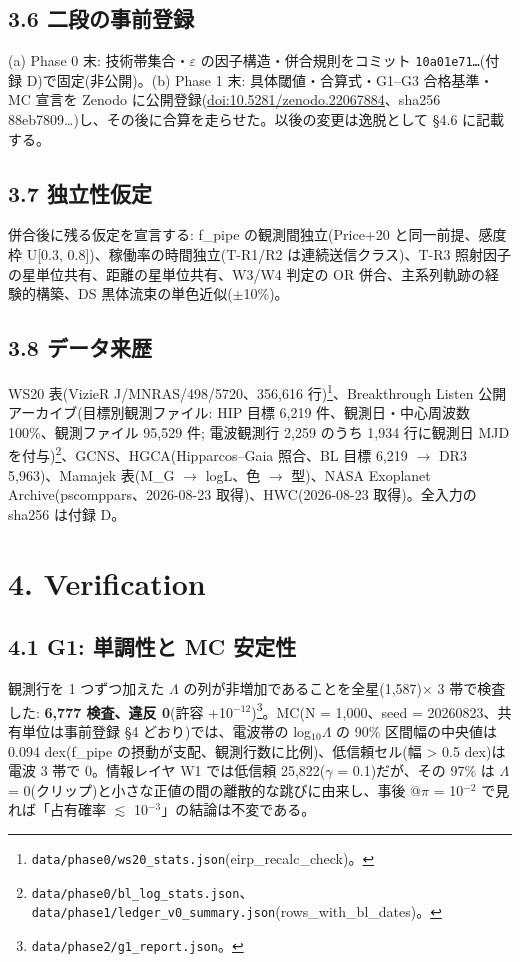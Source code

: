 \documentclass[11pt]{article}
\begin{document}
\subsection*{3.6 二段の事前登録}
\noindent (a) Phase 0 末: 技術帯集合・\(\varepsilon\) の因子構造・併合規則をコミット \texttt{10a01e71…}(付録 D)で固定(非公開)。(b) Phase 1 末: 具体閾値・合算式・G1–G3 合格基準・MC 宣言を Zenodo に公開登録(\url{doi:10.5281/zenodo.22067884}、sha256 88eb7809\ldots{})し、その後に合算を走らせた。以後の変更は逸脱として \S{}4.6 に記載する。\par\smallskip

\subsection*{3.7 独立性仮定}
\noindent 併合後に残る仮定を宣言する: f\_pipe の観測間独立(Price+20 と同一前提、感度枠 U[0.3, 0.8])、稼働率の時間独立(T-R1/R2 は連続送信クラス)、T-R3 照射因子の星単位共有、距離の星単位共有、W3/W4 判定の OR 併合、主系列軌跡の経験的構築、DS 黒体流束の単色近似(\(\pm\)10\%)。\par\smallskip

\subsection*{3.8 データ来歴}
\noindent WS20 表(VizieR J/MNRAS/498/5720、356,616 行)\footnote{\texttt{data/phase0/ws20\_stats.json}(eirp\_recalc\_check)。}、Breakthrough Listen 公開アーカイブ(目標別観測ファイル: HIP 目標 6,219 件、観測日・中心周波数 100\%、観測ファイル 95,529 件; 電波観測行 2,259 のうち 1,934 行に観測日 MJD を付与)\footnote{\texttt{data/phase0/bl\_log\_stats.json}、\texttt{data/phase1/ledger\_v0\_summary.json}(rows\_with\_bl\_dates)。}、GCNS、HGCA(Hipparcos–Gaia 照合、BL 目標 6,219 \(\rightarrow\) DR3 5,963)、Mamajek 表(M\_G \(\rightarrow\) logL、色 \(\rightarrow\) 型)、NASA Exoplanet Archive(pscomppars、2026-08-23 取得)、HWC(2026-08-23 取得)。全入力の sha256 は付録 D。\par\smallskip


\section*{4. Verification}

\subsection*{4.1 G1: 単調性と MC 安定性}
\noindent 観測行を 1 つずつ加えた \(\Lambda\) の列が非増加であることを全星(1,587)\(\times\) 3 帯で検査した: \textbf{6,777 検査、違反 0}(許容 +10\(^{-12}\))\footnote{\texttt{data/phase2/g1\_report.json}。}。MC(N = 1,000、seed = 20260823、共有単位は事前登録 \S{}4 どおり)では、電波帯の log\(_{10}\)\(\Lambda\) の 90\% 区間幅の中央値は 0.094 dex(f\_pipe の摂動が支配、観測行数に比例)、低信頼セル(幅 > 0.5 dex)は電波 3 帯で 0。情報レイヤ W1 では低信頼 25,822(\(\gamma\) = 0.1)だが、その 97\% は \(\Lambda\) = 0(クリップ)と小さな正値の間の離散的な跳びに由来し、事後 @\(\pi\) = 10\(^{-2}\) で見れば「占有確率 \(\lesssim\) 10\(^{-3}\)」の結論は不変である。\par\smallskip
\end{document}
